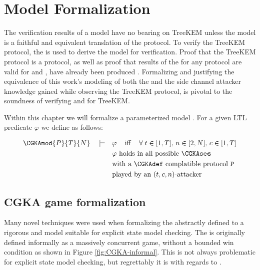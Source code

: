 \hypertarget{sec:model-formalization}{%
\chapter{Model Formalization}\label{sec:model-formalization}}

The verification results of a model have no bearing on TreeKEM unless the model is a faithful and equivalent translation of the protocol.
To verify the TreeKEM protocol, the \CGKAsec is used to derive the model for verification.
Proof that the TreeKEM protocol is a  protocol, as well as proof that results of the \CGKAsec for any  protocol are valid for  and , have already been produced \autocite{alwen2020security}.
Formalizing and justifying the equivalence of this work's modeling of both the \CGKAsec and the side channel attacker knowledge gained while observing the TreeKEM protocol, is pivotal to the soundness of verifying  and  for TreeKEM.

Within this chapter we will formalize a parameterized model .
For a given LTL predicate $\varphi$ we define  as follows:

\[
\begin{split}
\CGKAmod{P}{T}{N}\quad\models\quad& \varphi \;\;\;\textrm{ iff }\;\;\;\forall\; t \in [1, T],\, n \in [2, N],\, c \in [1, T]\\
  & \varphi \textrm{ holds in all possible \CGKAsec\!\!s}\\
  & \textrm{with a \CGKAdef complatible protocol } \mathtt{P}\\
  & \textrm{played by an } (t, c, n)\textrm{-attacker}
\end{split}
\]


\hypertarget{sec:game-adaptations}{%
\section{CGKA game formalization}\label{sec:game-adaptations}}

Many novel techniques were used when formalizing the abstractly defined \CGKAsec to a rigorous and model suitable for explicit state model checking.
The \CGKAsec is originally defined informally as a massively concurrent game, without a bounded win condition as shown in Figure \ref{fig:CGKA-informal}.
This is not always problematic for explicit state model checking, but regrettably it is with regards to \CGKAsec.

